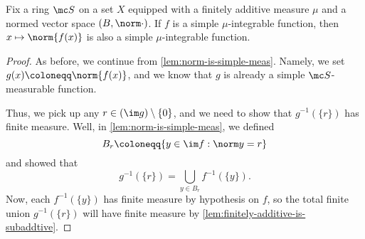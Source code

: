 \documentclass[../notes.tex]{subfiles}
\begin{document}
\begin{lemma} \label{lem:norm-is-simple-int}
	Fix a ring $\mc S$ on a set $X$ equipped with a finitely additive measure $\mu$ and a normed vector space $(B,\norm\cdot)$. If $f$ is a simple $\mu$-integrable function, then $x\mapsto\norm{f(x)}$ is also a simple $\mu$-integrable function.
\end{lemma}
\begin{proof}
	As before, we continue from \autoref{lem:norm-is-simple-meas}. Namely, we set $g(x)\coloneqq\norm{f(x)}$, and we know that $g$ is already a simple $\mc S$-measurable function.

	Thus, we pick up any $r\in(\im g)\setminus\{0\}$, and we need to show that $g^{-1}(\{r\})$ has finite measure. Well, in \autoref{lem:norm-is-simple-meas}, we defined
	\[B_r\coloneqq\{y\in\im f:\norm y=r\}\]
	and showed that
	\[g^{-1}(\{r\})=\bigcup_{y\in B_r}f^{-1}(\{y\}).\]
	Now, each $f^{-1}(\{y\})$ has finite measure by hypothesis on $f$, so the total finite union $g^{-1}(\{r\})$ will have finite measure by \autoref{lem:finitely-additive-is-subaddtive}.
\end{proof}
\end{document}
